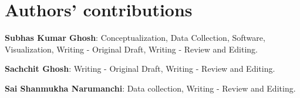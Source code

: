 \documentclass[final,authoryear,5p,times,twocolumn]{elsarticle}
\begin{document}
	\section{Authors' contributions}
	
	\textbf{Subhas Kumar Ghosh}: Conceptualization, Data Collection, Software, Visualization, Writing - Original Draft, Writing - Review and Editing.
	
	\textbf{Sachchit Ghosh}: Writing - Original Draft, Writing - Review and Editing.
	
	\textbf{Sai Shanmukha Narumanchi}: Data collection, Writing - Review and Editing.
	
	
		
\end{document}
